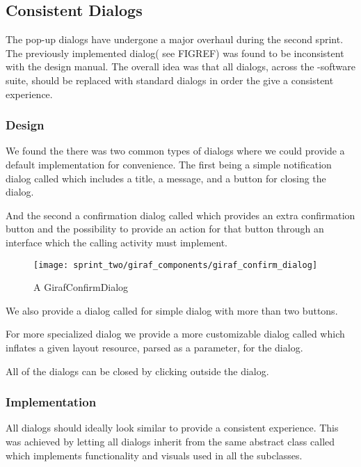 \subsection{Consistent Dialogs}
\label{sec:consistent_dialogs}

The pop-up dialogs have undergone a major overhaul during the second sprint. The previously implemented dialog( see FIGREF) was found to be inconsistent with the \giraf design manual. The overall idea was that all dialogs, across the \giraf-software suite, should be replaced with standard dialogs in order the give a consistent experience. 

\subsubsection{Design}

We found the there was two common types of dialogs where we could provide a default implementation for convenience. The first being a simple notification dialog called  which includes a title, a message, and a button for closing the dialog. 


And the second a confirmation dialog called  which provides an extra confirmation button and the possibility to provide an action for that button through an interface which the calling activity must implement. 

\begin{figure}[!htbp]
    \centering
    \texttt{[image: sprint\_two/giraf\_components/giraf\_confirm\_dialog]}
    \caption{A GirafConfirmDialog}
    \label{fig:ct_category_view}
\end{figure}

We also provide a dialog called  for simple dialog with more than two buttons.

For more specialized dialog we provide a more customizable dialog called  which inflates a given layout resource, parsed as a parameter, for the dialog.

All of the dialogs can be closed by clicking outside the dialog.

\subsubsection{Implementation}

All dialogs should ideally look similar to provide a consistent experience. This was achieved by letting all dialogs inherit from the same abstract class called  which implements functionality and visuals used in all the subclasses.

